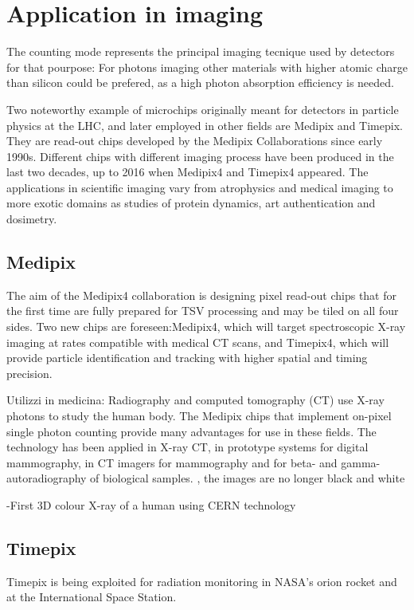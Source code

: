 \section{Application in imaging}
    The counting mode represents the principal imaging tecnique used by detectors for that pourpose: 
    For photons imaging other materials with higher atomic charge than silicon could be prefered, as a high photon absorption efficiency is needed. 

    Two noteworthy example of microchips originally meant
    for detectors in particle physics at the LHC, and later employed in other fields are Medipix and Timepix. They are read-out chips developed by the Medipix Collaborations since early 1990s. Different chips with different imaging process have been produced in the last two decades, up to 2016 when Medipix4 and Timepix4 appeared. 
    The applications in scientific imaging vary from atrophysics and medical imaging to more exotic domains as studies of protein dynamics, art authentication and dosimetry.

    \subsection{Medipix} 
    The aim of the Medipix4 collaboration is designing pixel read-out chips that for the first time are fully prepared for TSV processing and may be tiled on all four sides. 
    Two new chips are foreseen:Medipix4, which will target spectroscopic X-ray imaging at rates compatible with medical CT scans, and Timepix4, which will provide particle identification and tracking with higher spatial and timing precision.

    Utilizzi in medicina: 
    Radiography and computed tomography (CT) use X-ray photons to study the human body. The Medipix chips that implement on-pixel single photon counting provide many advantages for use in these fields. The technology has been applied in X-ray CT, in prototype systems for digital mammography, in CT imagers for mammography and for beta- and gamma-autoradiography of biological samples. , the images are no longer black and white

    -First 3D colour X-ray of a human using CERN technology


    \subsection{Timepix}
    Timepix is being exploited for radiation monitoring in NASA's orion rocket and at the International Space Station. 
    
